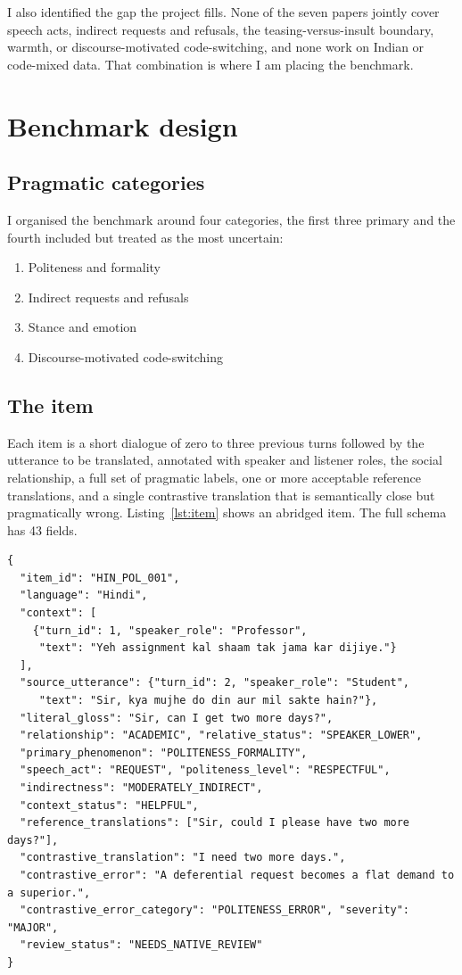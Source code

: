 \documentclass[11pt]{article}
\begin{document}
I also identified the gap the project fills. None of the seven papers jointly cover
speech acts, indirect requests and refusals, the teasing-versus-insult boundary,
warmth, or discourse-motivated code-switching, and none work on Indian or
code-mixed data. That combination is where I am placing the benchmark.

\section{Benchmark design}

\subsection{Pragmatic categories}
I organised the benchmark around four categories, the first three primary and the
fourth included but treated as the most uncertain:

\begin{enumerate}[label=(\arabic*)]
  \item Politeness and formality
  \item Indirect requests and refusals
  \item Stance and emotion
  \item Discourse-motivated code-switching
\end{enumerate}

\subsection{The item}
Each item is a short dialogue of zero to three previous turns followed by the
utterance to be translated, annotated with speaker and listener roles, the social
relationship, a full set of pragmatic labels, one or more acceptable reference
translations, and a single contrastive translation that is semantically close but
pragmatically wrong. Listing~\ref{lst:item} shows an abridged item. The full schema
has 43 fields.

\begin{lstlisting}[style=json,caption={An abridged benchmark item (HIN\_POL\_001).},label={lst:item}]
{
  "item_id": "HIN_POL_001",
  "language": "Hindi",
  "context": [
    {"turn_id": 1, "speaker_role": "Professor",
     "text": "Yeh assignment kal shaam tak jama kar dijiye."}
  ],
  "source_utterance": {"turn_id": 2, "speaker_role": "Student",
     "text": "Sir, kya mujhe do din aur mil sakte hain?"},
  "literal_gloss": "Sir, can I get two more days?",
  "relationship": "ACADEMIC", "relative_status": "SPEAKER_LOWER",
  "primary_phenomenon": "POLITENESS_FORMALITY",
  "speech_act": "REQUEST", "politeness_level": "RESPECTFUL",
  "indirectness": "MODERATELY_INDIRECT",
  "context_status": "HELPFUL",
  "reference_translations": ["Sir, could I please have two more days?"],
  "contrastive_translation": "I need two more days.",
  "contrastive_error": "A deferential request becomes a flat demand to a superior.",
  "contrastive_error_category": "POLITENESS_ERROR", "severity": "MAJOR",
  "review_status": "NEEDS_NATIVE_REVIEW"
}
\end{lstlisting}
\end{document}
